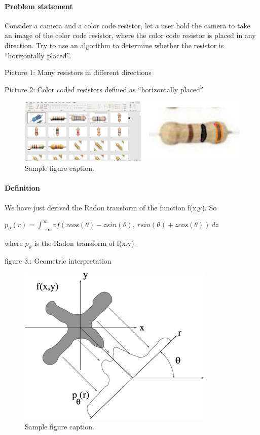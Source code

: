 \documentclass{article}
\begin{document}
\paragraph{Problem statement}
Consider a camera and a color code resistor, let a user hold the camera to take an image of the color code resistor, where the color code resistor is placed in any direction.
Try to use an algorithm to determine whether the resistor is “horizontally placed”.

Picture 1: Many resistors in different directions

Picture 2: Color coded resistors defined as “horizontally placed”

\begin{figure}
	\centering
	\includegraphics[width=0.7\linewidth]{Wr4nVKT.png}
	\caption{Sample figure caption.}
	\label{fig:wr4nvkt}
\end{figure}

\paragraph{Definition}

We have just derived the Radon transform of the function f(x,y). So

$p_\vartheta(r)=\int_{-\infty}^{\infty}vf(rcos(\theta)-zsin(\theta),\ rsin(\theta)+zcos(\theta))\ dz$

where $p_\vartheta$ is the Radon transform of f(x,y).\citep{githubGitHubGpeyrenumericaltours}

figure 3.: Geometric interpretation

\begin{figure}
	\centering
	\includegraphics[width=0.7\linewidth]{NwQ7eeG.png}
	\caption{Sample figure caption.}
	\label{fig:NwQ7eeG}
\end{figure}
\end{document}
